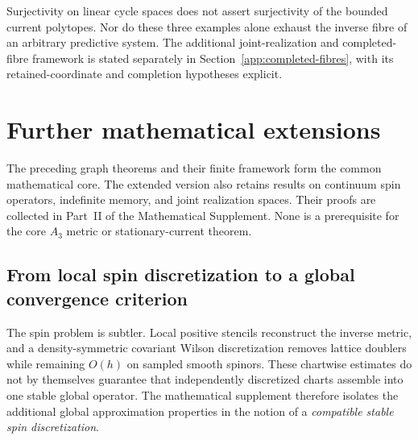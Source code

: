 \documentclass[11pt]{article}
\theoremstyle{definition}
\theoremstyle{remark}
\theoremstyle{definition}
\theoremstyle{remark}
\begin{document}
Surjectivity on linear cycle spaces does not assert surjectivity of the bounded
current polytopes.  Nor do these three examples alone exhaust the inverse
fibre of an arbitrary predictive system.  The additional joint-realization
and completed-fibre framework is stated separately in
Section~\ref{app:completed-fibres}, with its retained-coordinate and completion
hypotheses explicit.

\section{Further mathematical extensions}
\label{sec:extensions-main}

The preceding graph theorems and their finite framework form the common
mathematical core.  The extended version also retains results on continuum spin
operators, indefinite memory, and joint realization spaces.  Their proofs are
collected in Part~II of the Mathematical Supplement.  None is a prerequisite
for the core $A_3$ metric or stationary-current theorem.

\subsection{From local spin discretization to a global convergence criterion}

The spin problem is subtler.  Local positive stencils reconstruct the inverse metric,
and a density-symmetric covariant Wilson discretization removes lattice doublers while
remaining $O(h)$ on sampled smooth spinors.  These chartwise estimates do not by
themselves guarantee that independently discretized charts assemble into one stable
global operator.  The mathematical supplement therefore isolates the additional
global approximation properties in the notion of a \emph{compatible stable spin
discretization}.
\end{document}
